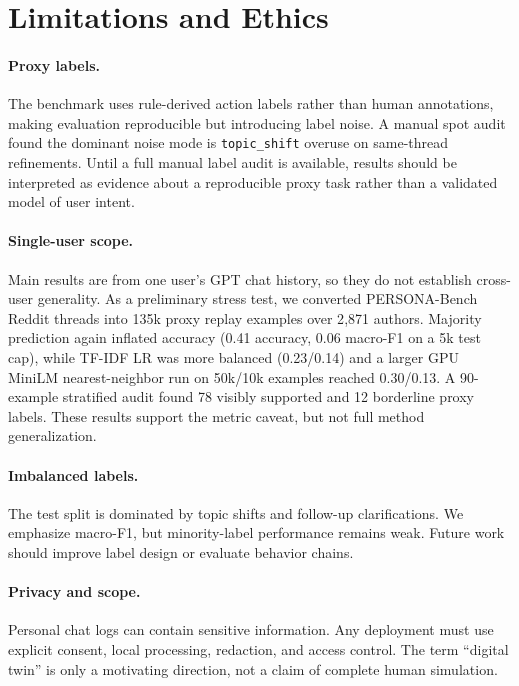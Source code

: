 \section{Limitations and Ethics}

\paragraph{Proxy labels.} The benchmark uses rule-derived action labels rather than human annotations, making evaluation reproducible but introducing label noise. A manual spot audit found the dominant noise mode is \texttt{topic\_shift} overuse on same-thread refinements. Until a full manual label audit is available, results should be interpreted as evidence about a reproducible proxy task rather than a validated model of user intent.

\paragraph{Single-user scope.} Main results are from one user's GPT chat history, so they do not establish cross-user generality. As a preliminary stress test, we converted PERSONA-Bench Reddit threads into 135k proxy replay examples over 2{,}871 authors. Majority prediction again inflated accuracy (0.41 accuracy, 0.06 macro-F1 on a 5k test cap), while TF-IDF LR was more balanced (0.23/0.14) and a larger GPU MiniLM nearest-neighbor run on 50k/10k examples reached 0.30/0.13. A 90-example stratified audit found 78 visibly supported and 12 borderline proxy labels. These results support the metric caveat, but not full method generalization.

\paragraph{Imbalanced labels.} The test split is dominated by topic shifts and follow-up clarifications. We emphasize macro-F1, but minority-label performance remains weak. Future work should improve label design or evaluate behavior chains.

\paragraph{Privacy and scope.} Personal chat logs can contain sensitive information. Any deployment must use explicit consent, local processing, redaction, and access control. The term ``digital twin'' is only a motivating direction, not a claim of complete human simulation.

